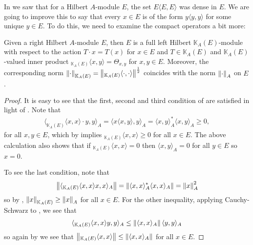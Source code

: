 In  we saw that for a Hilbert $A$-module $E$, the set $E \langle E, E \rangle$ was dense in $E$. We are going to improve this to say that every $x \in E$ is of the form $y \langle y,y \rangle$ for some unique $y \in E$. To do this, we need to examine the compact operators a bit more: 

\begin{proposition}
	Given a right Hilbert $A$-module $E$, then $E$ is a full left Hilbert $\mathbb{K}_A(E)$-module with respect to the action $T\cdot x = T(x)$ for $x \in E$ and $T \in \mathbb{K}_A(E)$ and $\mathbb{K}_A(E)$-valued inner product $_{\mathbb{K}_A(E)} \langle x,y \rangle = \Theta_{x,y}$ for $x, y \in E$. Moreover, the corresponding norm $\left\lVert \cdot \right\rVert_{\mathbb{K}_A(E)} = \left\lVert _{\mathbb{K}_A(E)} \langle \cdot, \cdot \rangle \right\rVert^{\frac12}$ coincides with the norm $\left\lVert \cdot \right\rVert_{A}$ on $E$.
	\label{mult:leftcompmod}
\end{proposition}
\begin{proof}
	It is easy to see that the first, second and third condition of  are satisfied in light of . Note that
	\begin{align}
		\langle _{\mathbb{K}_A(E)}\langle x,x \rangle \cdot y , y \rangle_A = \langle x \langle x,y \rangle , y \rangle_A = \langle x,y \rangle_A^* \langle x,y \rangle_A \geq 0,
		\label{eq:1}
	\end{align}
	for all $x,y \in E$, which by  implies $_{\mathbb{K}_A(E)} \langle x,x \rangle \geq 0$ for all $x \in E$. The above calculation also shows that if $_{\mathbb{K}_A(E) } \langle x, x \rangle = 0$ then $\langle x,y \rangle_A = 0$ for all $y \in E$ so $x = 0$.

	To see the last condition, note that 
	\begin{align*}
		\left\lVert \langle _{\mathbb{K}_A(E)} \langle x,x \rangle x , x \rangle_A \right\rVert = \left\lVert \langle x , x \rangle_A^* \langle x, x \rangle_A\right\rVert = \left\lVert x \right\rVert_A^2
	\end{align*}
	so by , $\left\lVert x \right\rVert_{\mathbb{K}_A(E)} \geq \left\lVert x \right\rVert_{A}$ for all $x \in E$. For the other inequality, applying Cauchy-Schwarz to , we see that 
	\begin{align*}
		\langle _{\mathbb{K}_A(E)} \langle x,x \rangle y , y \rangle_A \leq \left\lVert \langle x,x \rangle_A \right\rVert \langle y,y \rangle_A	
	\end{align*}
	so again by  we see that $\left\lVert _{\mathbb{K}_A(E)} \langle x, x \rangle\right\rVert \leq \left\lVert \langle x,x\rangle_A \right\rVert$ for all $x \in E$.
\end{proof}
